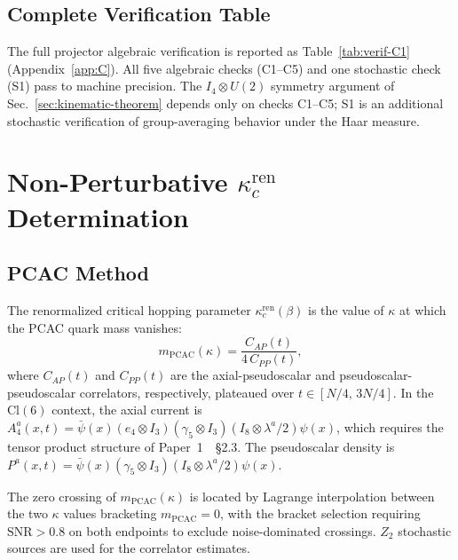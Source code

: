 \documentclass[12pt]{article}
\theoremstyle{definition}
\theoremstyle{remark}
\newcommand{\cl}{\mathrm{Cl}}           %
\newcommand{\kcren}{\kappa_{c}^{\mathrm{ren}}}      %
\newcommand{\mPCAC}{m_{\mathrm{PCAC}}}               %
\begin{document}
	\subsection{Complete Verification Table}
	\label{sec:proj-verification}
	
	The full projector algebraic verification is reported as
	Table~\ref{tab:verif-C1} (Appendix~\ref{app:C}).  All five algebraic checks
	(C1--C5) and one stochastic check (S1) pass to machine precision.  The
	$I_4{\otimes}U(2)$ symmetry argument of Sec.~\ref{sec:kinematic-theorem}
	depends only on checks C1--C5; S1 is an additional stochastic verification
	of group-averaging behavior under the Haar measure.
	
	\section{Non-Perturbative \texorpdfstring{$\kcren$}{kappa_c^ren}
		Determination}
	\label{sec:kappa-c}
	
	\subsection{PCAC Method}
	\label{sec:pcac-method}
	
	The renormalized critical hopping parameter $\kcren(\beta)$ is the value of
	$\kappa$ at which the PCAC quark mass vanishes:
	\begin{equation}
		\mPCAC(\kappa) = \frac{C_{AP}(t)}{4\,C_{PP}(t)},
		\label{eq:mPCAC}
	\end{equation}
	where $C_{AP}(t)$ and $C_{PP}(t)$ are the axial-pseudoscalar and
	pseudoscalar-pseudoscalar correlators, respectively, plateaued over
	$t\in[N/4,\,3N/4]$.  In the $\cl(6)$ context, the axial current is
	$A_4^a(x,t) = \bar\psi(x)(e_4\otimes I_3)(\gamma_5\otimes I_3)
	(I_8\otimes\lambda^a/2)\psi(x)$, which requires the tensor product structure
	of Paper~1~\cite{FirestoneP1}~\S2.3.  The pseudoscalar density is
	$P^a(x,t) = \bar\psi(x)(\gamma_5\otimes I_3)(I_8\otimes\lambda^a/2)\psi(x)$.
	
	The zero crossing of $\mPCAC(\kappa)$ is located by Lagrange interpolation
	between the two $\kappa$ values bracketing $\mPCAC=0$, with the bracket
	selection requiring $\mathrm{SNR}>0.8$ on both endpoints to exclude
	noise-dominated crossings.  $Z_2$ stochastic sources are used for the
	correlator estimates.
	
\end{document}
